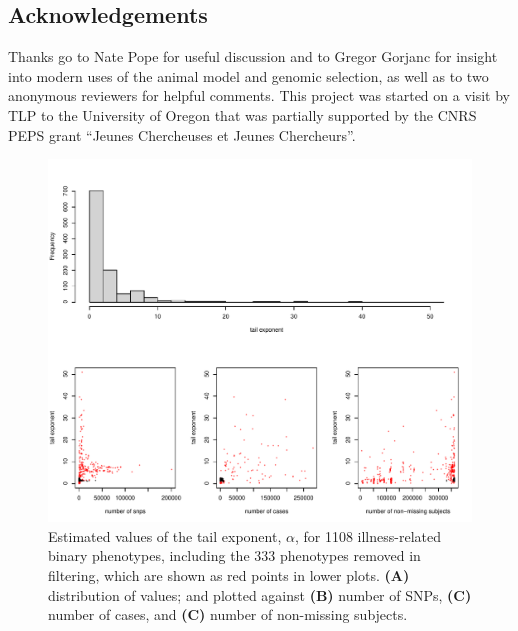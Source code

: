 \documentclass{article}
\newcommand{\1}{\mathbbm{1}}
\theoremstyle{remark}
\theoremstyle{definition}
\begin{document}
\subsection*{Acknowledgements}
Thanks go to Nate Pope for useful discussion
and to Gregor Gorjanc for insight into modern uses
of the animal model and genomic selection,
as well as to two anonymous reviewers for helpful comments.
This project was started on a visit by TLP to the University of Oregon that was partially supported by the CNRS PEPS grant ``Jeunes Chercheuses et Jeunes Chercheurs''.




\appendix
\setcounter{table}{0}
\renewcommand{\thetable}{S\arabic{table}}
\setcounter{figure}{0}
\renewcommand{\thefigure}{S\arabic{figure}}

\begin{figure}
    \begin{center}
    \includegraphics{snp_effects/unfiltered_results_10}
    \end{center}
    \caption{
        Estimated values of the tail exponent, $\alpha$,
        for 1108 illness-related binary phenotypes,
        including the 333 phenotypes removed in filtering,
        which are shown as red points in lower plots.
        \textbf{(A)} distribution of values; and plotted against
        \textbf{(B)} number of SNPs,
        \textbf{(C)} number of cases, and
        \textbf{(C)} number of non-missing subjects.
        \label{fig:unfiltered_hist}
    }
\end{figure}
\end{document}
